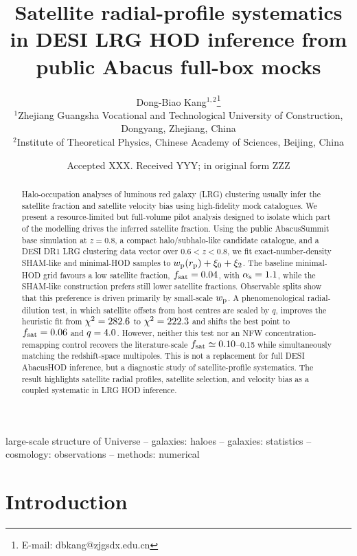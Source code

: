 \documentclass[fleqn,usenatbib]{mnras}
\title[Satellite-profile systematics in LRG HOD fits]{Satellite radial-profile systematics in DESI LRG HOD inference from public Abacus full-box mocks}
\author[Kang]{
Dong-Biao Kang$^{1,2}$\thanks{E-mail: dbkang@zjgsdx.edu.cn}
\\
$^{1}$Zhejiang Guangsha Vocational and Technological University of Construction, Dongyang, Zhejiang, China\\
$^{2}$Institute of Theoretical Physics, Chinese Academy of Sciences, Beijing, China
}
\date{Accepted XXX. Received YYY; in original form ZZZ}
\newcommand{\fsat}{f_{\rm sat}}
\newcommand{\alphas}{\alpha_{\rm s}}
\newcommand{\wproj}{w_{\rm p}}
\newcommand{\xizero}{\xi_0}
\newcommand{\xitwo}{\xi_2}
\begin{document}
\label{firstpage}
\pagerange{\pageref{firstpage}--\pageref{lastpage}}
\maketitle

\begin{abstract}
Halo-occupation analyses of luminous red galaxy (LRG) clustering usually infer the satellite fraction and satellite velocity bias using high-fidelity mock catalogues.  We present a resource-limited but full-volume pilot analysis designed to isolate which part of the modelling drives the inferred satellite fraction.  Using the public AbacusSummit base simulation at $z=0.8$, a compact halo/subhalo-like candidate catalogue, and a DESI DR1 LRG clustering data vector over $0.6<z<0.8$, we fit exact-number-density SHAM-like and minimal-HOD samples to $\wproj(r_{\rm p})+\xizero+\xitwo$.  The baseline minimal-HOD grid favours a low satellite fraction, $\fsat=\BestHODFsat$, with $\alphas=\BestHODAlpha$, while the SHAM-like construction prefers still lower satellite fractions.  Observable splits show that this preference is driven primarily by small-scale $\wproj$.  A phenomenological radial-dilution test, in which satellite offsets from host centres are scaled by $q$, improves the heuristic fit from $\chi^2=282.6$ to $\chi^2=222.3$ and shifts the best point to $\fsat=\BestDilFsat$ and $q=4.0$.  However, neither this test nor an NFW concentration-remapping control recovers the literature-scale $\fsat\simeq0.10$--0.15 while simultaneously matching the redshift-space multipoles.  This is not a replacement for full DESI AbacusHOD inference, but a diagnostic study of satellite-profile systematics.  The result highlights satellite radial profiles, satellite selection, and velocity bias as a coupled systematic in LRG HOD inference.
\end{abstract}

\begin{keywords}
large-scale structure of Universe -- galaxies: haloes -- galaxies: statistics -- cosmology: observations -- methods: numerical
\end{keywords}

\section{Introduction}
\end{document}
